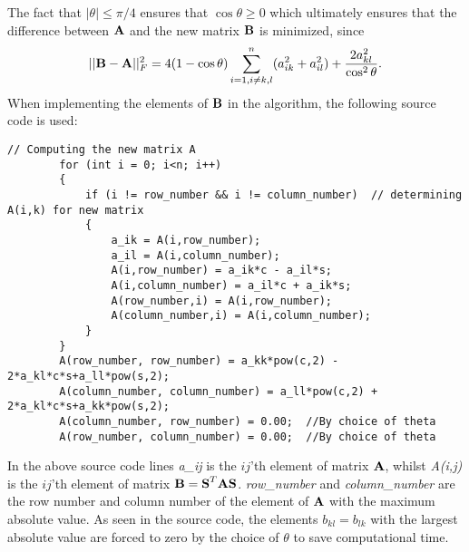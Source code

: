 The fact that $|\theta| \leq \pi/4$ ensures that $\cos \theta \geq 0$ which ultimately ensures that the difference between $\mbox{\textbf{A}}$ and the new matrix $\mbox{\textbf{B}}$ is minimized, since
\begin{align}
	||\mbox{\textbf{B}}-\mbox{\textbf{A}}||_F^2=4(1-\cos \theta)\sum_{i=1,i\ne k,l}^n(a_{ik}^2+a_{il}^2) +\frac{2a_{kl}^2}{\cos ^2\theta}.
\end{align}
When implementing the elements of $\mbox{\textbf{B}}$ in the algorithm, the following source code is used:
\begin{lstlisting}
// Computing the new matrix A
        for (int i = 0; i<n; i++)
        {
            if (i != row_number && i != column_number)  // determining A(i,k) for new matrix
            {
                a_ik = A(i,row_number);
                a_il = A(i,column_number);
                A(i,row_number) = a_ik*c - a_il*s;
                A(i,column_number) = a_il*c + a_ik*s;
                A(row_number,i) = A(i,row_number);
                A(column_number,i) = A(i,column_number);
            }
        }
        A(row_number, row_number) = a_kk*pow(c,2) - 2*a_kl*c*s+a_ll*pow(s,2);
        A(column_number, column_number) = a_ll*pow(c,2) + 2*a_kl*c*s+a_kk*pow(s,2);
        A(column_number, row_number) = 0.00;  //By choice of theta
        A(row_number, column_number) = 0.00;  //By choice of theta
\end{lstlisting}
In the above source code lines \textit{a\_ij} is the $ij$'th element of matrix $\mbox{\textbf{A}}$, whilst \textit{A(i,j)} is the $ij$'th element of matrix $\mbox{\textbf{B}}=\mbox{\textbf{S}} ^T\mbox{\textbf{A}} \mbox{\textbf{S}}$. \textit{row\_number} and \textit{column\_number} are the row number and column number of the element of $\mbox{\textbf{A}}$ with the maximum absolute value. 
As seen in the source code, the elements $b_{kl} = b_{lk}$ with the largest absolute value are forced to zero by the choice of $\theta$ to save computational time.  